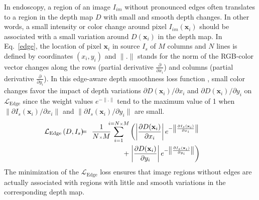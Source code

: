 \documentclass[a4paper,fleqn]{cas-dc}
\begin{document}
\vspace*{2mm}
%
In endoscopy, a region of an image $I_{im}$ without pronounced edges often translates to a region in the depth map $D$ with  small and smooth depth changes. In other words, a small intensity or color change around pixel $I_{im}(\mathbf{x}_i)$ should be associated with a small variation around $D(\mathbf{x}_i)$ in the depth map. In Eq.~\eqref{edge}, the location of pixel $\mathbf{x}_i$ in source $I_{s}$ of $M$ columns and $N$ lines is defined by coordinates $(x_i, y_i)$ and $\|.\|$ stands for the norm of the RGB-color vector changes along the rows (partial derivative $\scriptstyle \frac{\partial}{\partial x_i}$) and columns (partial derivative $\scriptstyle \frac{\partial}{\partial y_i}$). In this edge-aware depth smoothness loss function \citep{Godard_ICCV_2019}, small color changes favor the impact of depth variations $\partial D(\mathbf{x}_i)/\partial x_i$ and $\partial D(\mathbf{x}_i)/\partial y_i$ on $\mathcal{L}_{\textrm{Edge}}$ since the weight values $e^{-\|.\|}$ tend to the maximum value of 1 when $\|\partial I_s(\mathbf{x}_i)/\partial x_i\|$ and $\|\partial I_s(\mathbf{x}_i)/\partial y_i\|$ are small.
%
\begin{eqnarray} \label{edge} \hspace{-8 mm}
\mathcal{L}_{\textrm{Edge}}\left(D, I_s\right) \hspace{-2 mm}&=&\hspace{-2 mm} \frac{1}{N{\scriptscriptstyle \times}M} \hspace{-2 mm} \sum_{i=1}^{i=N{\scriptscriptstyle \times}M} \left(
\left| \frac{\partial D(\mathbf{x}_i)}{\partial x_i} \right| e^{-\left\|\frac{\partial I_{s}(\mathbf{x}_i)}{\partial x_i}\right\|} \nonumber \right.\\ 
%
& & \hspace{15 mm}+ 
%
\left.\left| \frac{\partial D(\mathbf{x}_i)}{\partial y_i} \right| e^{-\left\|\frac{\partial I_{s}(\mathbf{x}_i)}{\partial y_i}\right\|}\right)
\end{eqnarray}
%
The minimization of the $\mathcal{L}_{\textrm{Edge}}$ loss ensures that image regions without edges  are actually associated with regions with little and smooth variations in the corresponding depth map.  
%
\end{document}
